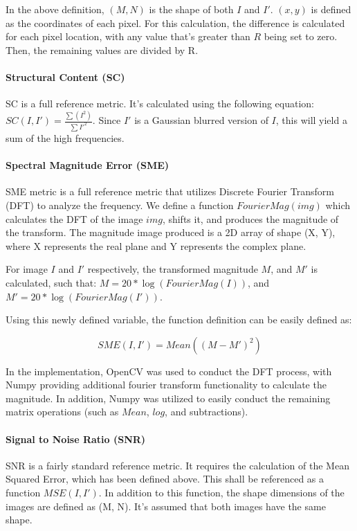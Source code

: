 \documentclass[10pt,a4paper]{article}
\begin{document}
                In the above definition, $(M, N)$ is the shape of both $I$ and $I'$. $(x, y)$ is defined as the coordinates of each pixel. For this calculation,
                the difference is calculated for each pixel location, with any value that's greater than $R$ being set to zero. Then, the remaining values are divided by R.

            \paragraph{Structural Content (SC)}
                SC is a full reference metric. It's calculated using the following equation: $SC(I, I') = \frac{\sum(I^2)}{\sum{I'^2}}$.
                Since $I'$ is a Gaussian blurred version of $I$, this will yield a sum of the high frequencies.

            \paragraph{Spectral Magnitude Error (SME)}
                SME metric is a full reference metric that utilizes Discrete Fourier Transform (DFT) to analyze the frequency.
                We define a function $FourierMag(img)$ which calculates the DFT of the image $img$, shifts it, and produces the magnitude of the transform. The magnitude image produced
                is a 2D array of shape (X, Y), where X represents the real plane and Y represents the complex plane.

                For image $I$ and $I'$ respectively, the transformed magnitude $M$, and $M'$ is calculated, such that:
                $M = 20*\log(FourierMag(I))$, and $M' = 20 * \log(FourierMag(I'))$.

                Using this newly defined variable, the function definition can be easily defined as:

                $$SME(I, I') = Mean((M - M')^2)$$

                In the implementation, OpenCV was used to conduct the DFT process, with Numpy providing additional fourier transform functionality to calculate the magnitude. In addition, Numpy
                was utilized to easily conduct the remaining matrix operations (such as $Mean$, $log$, and subtractions).

            \paragraph{Signal to Noise Ratio (SNR)}
                SNR is a fairly standard reference metric. It requires the calculation of the Mean Squared Error, which has been defined above. This shall be referenced as a function $MSE(I, I')$.
                In addition to this function, the shape dimensions of the images are defined as (M, N). It's assumed that both images have the same shape.
\end{document}
